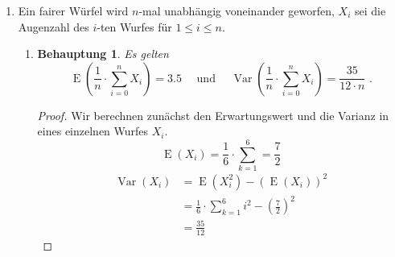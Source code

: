\documentclass[a4paper]{scrartcl}
\newtheorem*{behaupt}{Behauptung}
\newcommand{\e}{\operatorname{E}}
\newcommand{\var}{\operatorname{Var}}
\begin{document}
\begin{enumerate}[label=\bfseries\arabic*.]
    \item
        Ein fairer Würfel wird $n$-mal unabhängig voneinander geworfen, $X_i$
        sei die Augenzahl des $i$-ten Wurfes für $1 \leq i \leq n$.
        \begin{enumerate}[label=(\alph*)]
            \item
                \begin{behaupt}
                    Es gelten
                    \begin{equation*}
                        \e \left( \frac{1}{n} \cdot \sum_{i=0}^n X_i \right)
                        = \num{3,5}
                        \quad \text{ und } \quad
                        \var \left( \frac{1}{n} \cdot \sum_{i=0}^n X_i \right)
                        = \frac{35}{12 \cdot n}
                        \text{ .}
                    \end{equation*}
                \end{behaupt}
                \begin{proof}
                    Wir berechnen zunächst den Erwartungswert und die Varianz
                    in eines einzelnen Wurfes $X_i$.
                    \begin{equation*}
                        \e(X_i) = \frac{1}{6} \cdot \sum_{k=1}^6 = \frac{7}{2}
                    \end{equation*}
                    \begin{equation*}
                        \begin{split}
                            \var(X_i) 
                            &= \e(X_i^2) - (\e(X_i))^2 \\
                            &= \frac{1}{6} \cdot \sum_{k=1}^6 i^2
                                - \left( \frac{7}{2} \right)^2 \\
                            &= \frac{35}{12}
                        \end{split}
                    \end{equation*}


\end{proof}
\end{enumerate}
\end{enumerate}
\end{document}
